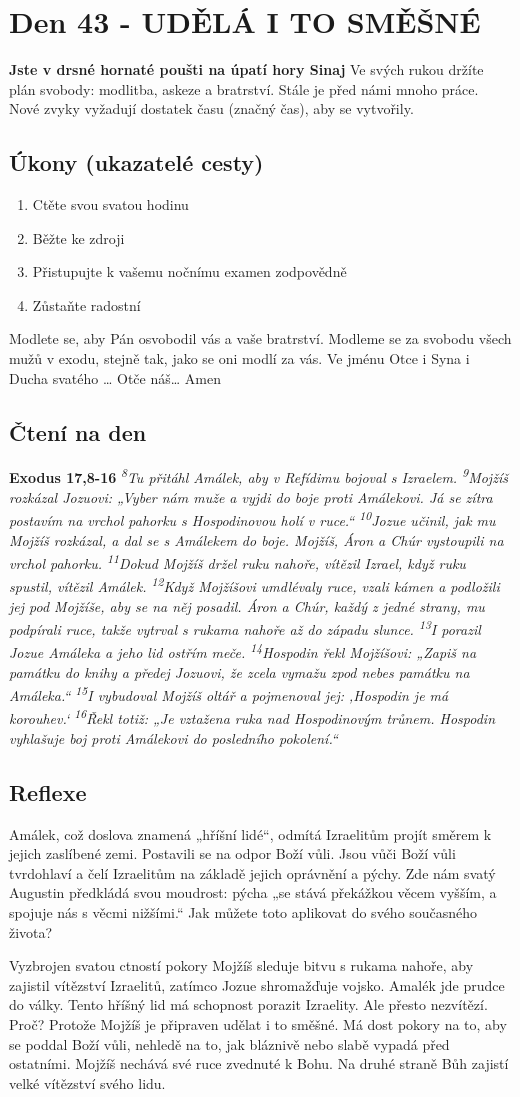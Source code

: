 \documentclass[11pt]{article}
\newcommand{\zacatekSedmyTyden}{
  \textbf{Jste v drsné hornaté poušti na úpatí hory Sinaj} \newline 
  Ve svých rukou držíte plán svobody: modlitba, askeze a bratrství. Stále je před námi mnoho práce. Nové zvyky vyžadují dostatek času (značný čas), aby se vytvořily.

  \subsection*{Úkony (ukazatelé cesty)}
\begin{enumerate}
  \item Ctěte svou svatou hodinu
  \item Běžte ke zdroji
  \item Přistupujte k vašemu nočnímu examen zodpovědně
  \item Zůstaňte radostní
\end{enumerate}
Modlete se, aby Pán osvobodil vás a vaše bratrství. \newline
Modleme se za svobodu všech mužů v exodu, stejně tak, jako se oni modlí za vás.\newline
Ve jménu Otce i Syna i Ducha svatého …  Otče náš… Amen
}
\begin{document}
\newpage
\section{Den 43 - UDĚLÁ I TO SMĚŠNÉ }
\zacatekSedmyTyden
\subsection*{Čtení na den}
\textbf{Exodus 17,8-16}
\newline
\textit{
\textsuperscript{8}Tu přitáhl Amálek, aby v Refídimu bojoval s Izraelem.
\textsuperscript{9}Mojžíš rozkázal Jozuovi: „Vyber nám muže a vyjdi do boje proti Amálekovi. Já se zítra postavím na vrchol pahorku s Hospodinovou holí v ruce.“
\textsuperscript{10}Jozue učinil, jak mu Mojžíš rozkázal, a dal se s Amálekem do boje. Mojžíš, Áron a Chúr vystoupili na vrchol pahorku.
\textsuperscript{11}Dokud Mojžíš držel ruku nahoře, vítězil Izrael, když ruku spustil, vítězil Amálek.
\textsuperscript{12}Když Mojžíšovi umdlévaly ruce, vzali kámen a podložili jej pod Mojžíše, aby se na něj posadil. Áron a Chúr, každý z jedné strany, mu podpírali ruce, takže vytrval s rukama nahoře až do západu slunce.
\textsuperscript{13}I porazil Jozue Amáleka a jeho lid ostřím meče.
\textsuperscript{14}Hospodin řekl Mojžíšovi: „Zapiš na památku do knihy a předej Jozuovi, že zcela vymažu zpod nebes památku na Amáleka.“
\textsuperscript{15}I vybudoval Mojžíš oltář a pojmenoval jej: ‚Hospodin je má korouhev.‘
\textsuperscript{16}Řekl totiž: „Je vztažena ruka nad Hospodinovým trůnem. Hospodin vyhlašuje boj proti Amálekovi do posledního pokolení.“
}

\subsection*{Reflexe}

Amálek, což doslova znamená „hříšní lidé“, odmítá Izraelitům projít směrem k jejich zaslíbené zemi. Postavili
se na odpor Boží vůli. Jsou vůči Boží vůli tvrdohlaví a čelí Izraelitům na základě jejich oprávnění a pýchy. Zde
nám svatý Augustin předkládá svou moudrost: pýcha „se stává překážkou věcem vyšším, a spojuje nás s věcmi
nižšími.“ Jak můžete toto aplikovat do svého současného života?

Vyzbrojen svatou ctností pokory Mojžíš sleduje bitvu s rukama nahoře, aby zajistil vítězství Izraelitů, zatímco
Jozue shromažďuje vojsko. Amalék jde prudce do války. Tento hříšný lid má schopnost porazit Izraelity. Ale
přesto nezvítězí. Proč? Protože Mojžíš je připraven udělat i to směšné. Má dost pokory na to, aby se poddal
Boží vůli, nehledě na to, jak bláznivě nebo slabě vypadá před ostatními. Mojžíš nechává své ruce zvednuté
k Bohu. Na druhé straně Bůh zajistí velké vítězství svého lidu.
\end{document}
